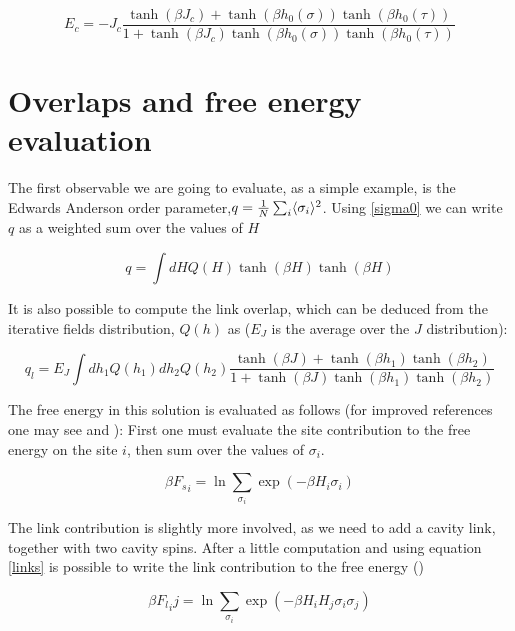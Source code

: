  \begin{equation}
{E}_c = - J_c \frac{\tanh(\beta J_c)+\tanh(\beta h_0(\sigma))\tanh(\beta h_0(\tau))}
{1+\tanh(\beta J_c)\tanh(\beta h_0(\sigma))\tanh(\beta h_0(\tau))}
\label{links}
\end{equation}

\section{Overlaps and free energy evaluation}

The first observable we are going to evaluate, as a simple example, is the Edwards Anderson order parameter,$q ={1\over N} \sum_i \langle\sigma_i\rangle^2$.
Using \ref{sigma0} we can write $q$ as a weighted sum over the values of $H$

\begin{equation}
q = \int dHQ(H) \tanh(\beta H)\tanh(\beta H)
\label{qsite}
\end{equation}

It is also possible to compute the link overlap, which can be deduced from the iterative fields distribution, $Q(h)$ as ($E_J$ is the average over the $J$ distribution):

\begin{equation}
q_l = E_J \int dh_1Q(h_1)dh_2Q(h_2) \frac{\tanh(\beta J)+\tanh(\beta h_1)\tanh(\beta h_2)}
{1+\tanh(\beta J)\tanh(\beta h_1)\tanh(\beta h_2)}
\label{qlink}
\end{equation}


The free energy in this solution is evaluated as follows (for improved references one may see \cite{bethe} and \cite{katsu}):
First one must evaluate the site contribution to the free energy on the site $i$, then sum over the values of $\sigma_i$.

\begin{equation}
\beta {F_s}_i = \ln \sum_{\sigma_i} \exp(-\beta H_i \sigma_i )
\label{siteF}
\end{equation}

The link contribution is slightly more involved, as we need to add a cavity link, together with two cavity spins.
After a little computation and using equation \ref{links} is possible to write the link contribution to the free energy (\cite{bethe})

\begin{equation}
\beta {F_l}_ij = \ln \sum_{\sigma_i} \exp(-\beta H_iH_j \sigma_i\sigma_j )
\label{linkF}
\end{equation}

